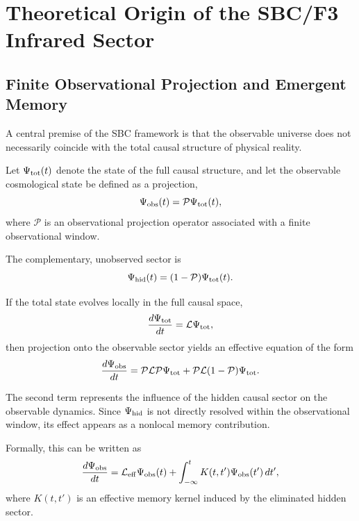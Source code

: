 \section{Theoretical Origin of the SBC/F3 Infrared Sector}

\subsection{Finite Observational Projection and Emergent Memory}

A central premise of the SBC framework is that the observable universe does not necessarily coincide with the total causal structure of physical reality.

Let \(\Psi_{\rm tot}(t)\) denote the state of the full causal structure, and let the observable cosmological state be defined as a projection,
\begin{equation}
\Psi_{\rm obs}(t)
=
\mathcal{P}\Psi_{\rm tot}(t),
\end{equation}
where \(\mathcal{P}\) is an observational projection operator associated with a finite observational window.

The complementary, unobserved sector is
\begin{equation}
\Psi_{\rm hid}(t)
=
(1-\mathcal{P})\Psi_{\rm tot}(t).
\end{equation}

If the total state evolves locally in the full causal space,
\begin{equation}
\frac{d\Psi_{\rm tot}}{dt}
=
\mathcal{L}\Psi_{\rm tot},
\end{equation}
then projection onto the observable sector yields an effective equation of the form
\begin{equation}
\frac{d\Psi_{\rm obs}}{dt}
=
\mathcal{P}\mathcal{L}\mathcal{P}\Psi_{\rm tot}
+
\mathcal{P}\mathcal{L}(1-\mathcal{P})\Psi_{\rm tot}.
\end{equation}

The second term represents the influence of the hidden causal sector on the observable dynamics. Since \(\Psi_{\rm hid}\) is not directly resolved within the observational window, its effect appears as a nonlocal memory contribution.

Formally, this can be written as
\begin{equation}
\frac{d\Psi_{\rm obs}}{dt}
=
\mathcal{L}_{\rm eff}\Psi_{\rm obs}(t)
+
\int_{-\infty}^{t}
K(t,t')\Psi_{\rm obs}(t')\,dt',
\end{equation}
where \(K(t,t')\) is an effective memory kernel induced by the eliminated hidden sector.

